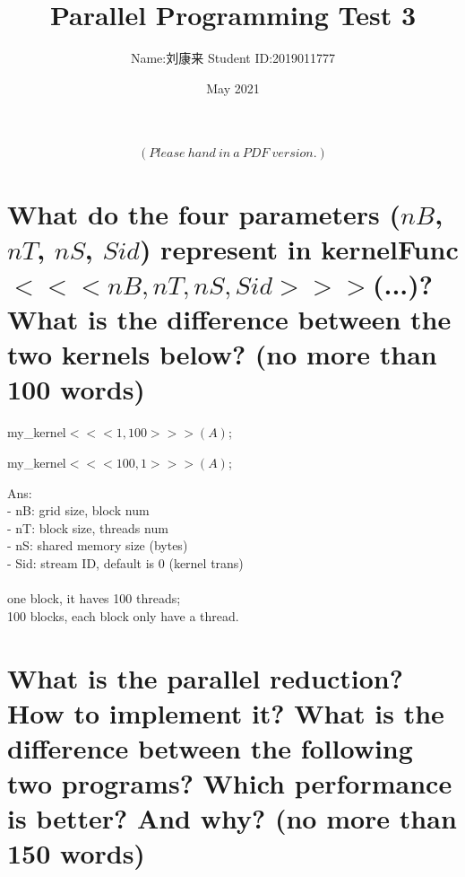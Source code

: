 \documentclass{article}
\title{Parallel Programming Test 3}
\author{Name:刘康来  \qquad Student ID:2019011777}
\date{May 2021}
\begin{document}
\maketitle
$$(Please\ hand\ in\ a\ PDF\ version.)$$

\section{What do the four parameters ($nB$, $nT$, $nS$, $Sid$) represent in kernelFunc$<<<nB,nT,nS,Sid>>>$(...)? What is the difference between the two kernels below? (no more than 100 words)}
\qquad \quad my\_kernel$<<< 1, 100 >>>(A)$;

\qquad \quad my\_kernel$<<< 100, 1 >>>(A)$; 

Ans:%
~\\- nB: grid size, block num\\
- nT: block size, threads num\\
- nS: shared memory size (bytes)\\
- Sid: stream ID, default is 0 (kernel trans)\\


~\\one block, it haves 100 threads;
~\\100 blocks, each block only have a thread.
\section{What is the parallel reduction? How to implement it? What is the difference between the following two programs? Which performance is better? And why? (no more than 150 words)}
\end{document}
